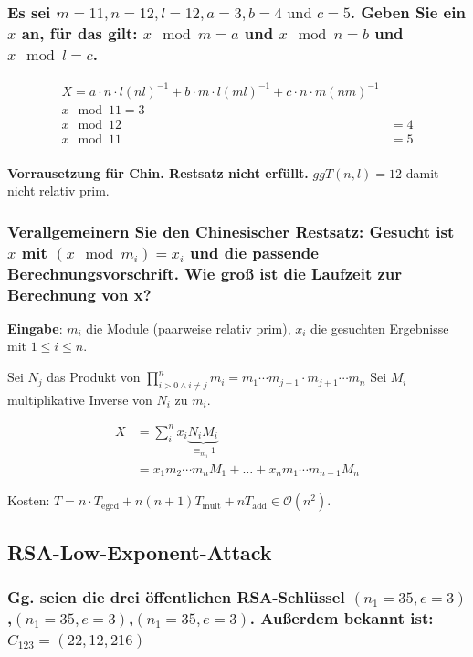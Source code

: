 \subsubsection{Es sei $m = 11, n = 12, l = 12, a = 3, b = 4 \text{ und } c=5$. Geben Sie ein $x$ an, für das
gilt: $x \mod m = a$ und $x \mod n = b$ und $x \mod l = c$.}



\begin{align}
 X = a \cdot n \cdot l (nl)^{-1}
   + b \cdot m \cdot l (ml)^{-1}
   + c \cdot n \cdot m (nm)^{-1} \\
 x \mod 11 = 3 \\
  x \mod 12 &= 4\\
   x \mod 11 &= 5\\
\end{align}




\textbf{Vorrausetzung für Chin. Restsatz nicht erfüllt.}
$ggT(n,l)=12$ damit nicht relativ prim.


\subsubsection{Verallgemeinern Sie den Chinesischer Restsatz:
Gesucht ist $x$ mit $(x \mod m_i)=x_i$ und die passende Berechnungsvorschrift. Wie groß ist die Laufzeit zur Berechnung von x?}

\textbf{Eingabe}: $m_i$ die Module (paarweise relativ prim), $x_i$ die gesuchten Ergebnisse mit $1 \le i \le n$. 

Sei $N_j$ das Produkt von $ \prod_{i>0 \wedge i \ne j}^{n} m_i = 
	m_1 \cdots m_{j-1} \cdot m_{j+1} \cdots m_n$	
Sei $M_i$ multiplikative Inverse von $N_i$ zu $m_i$.

\begin{align}
	X &= \sum_{i}^{n} x_i \underbrace{N_i M_i}_{\equiv_{m_i} 1} \\
	  &= x_1 m_2 \cdots m_n M_1 + \ldots + x_n m_1 \cdots m_{n-1} M_n	
\end{align}

Kosten: $T = n \cdot T_{\text{egcd}} + n (n+1) T_{\text{mult}} + n T_{\text{add}} \in \mathcal{O}(n^2)$.

\subsection{RSA-Low-Exponent-Attack}
\subsubsection{Gg. seien die drei öffentlichen RSA-Schlüssel $(n_1 = 35,e=3)$,$(n_1 = 35,e=3)$,$(n_1 = 35,e=3)$.
Außerdem bekannt ist: $C_{123}=(22,12,216)$}

